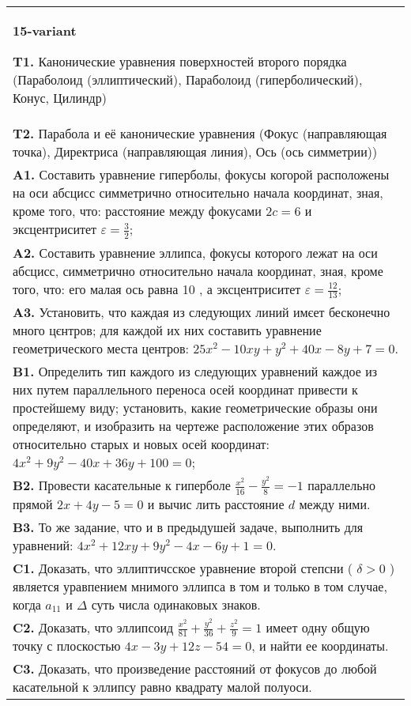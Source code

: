 \documentclass{article}
\begin{document}
\begin{tabular}{m{17cm}}
\textbf{15-variant}
\newline

\textbf{T1.} Канонические уравнения поверхностей второго порядка (Параболоид (эллиптический), Параболоид (гиперболический), Конус, Цилиндр) \\
\textbf{T2.} Парабола и её канонические уравнения (Фокус (направляющая точка), Директриса (направляющая линия), Ось (ось симметрии)) \\
\textbf{A1.} Составить уравнение гиперболы, фокусы когорой расположены на оси абсцисс симметрично относительно начала координат, зная, кроме того, что: расстояние между фокусами $2 c=6$ и эксцентриситет $\varepsilon=\frac{3}{2}$; \\
\textbf{A2.} Составить уравнение эллипса, фокусы которого лежат на оси абсцисс, симметрично относительно начала координат, зная, кроме того, что: его малая ось равна 10 , а эксцентриситет $\varepsilon=\frac{12}{13}$; \\
\textbf{A3.} Установить, что каждая из следующих линий имєет бесконечно много цєнтров; для каждой их них составить уравнение геометрического места центров: $25 x^2-10 x y+y^2+40 x-8 y+7=0$. \\
\textbf{B1.} Определить тип каждого из следующих уравнений каждое из них путем параллельного переноса осей координат привести к простейшему виду; установить, какие геометрические образы они определяют, и изобразить на чертеже расположение этих образов относительно старых и новых осей координат: $4 x^2+9 y^2-40 x+36 y+100=0$; \\
\textbf{B2.} Провести касательные к гиперболе $\frac{x^2}{16}-\frac{y^2}{8}=-1$ параллельно прямой $2 x+4 y-5=0$ и вычис лить расстояние $d$ между ними. \\
\textbf{B3.} То же задание, что и в предыдушей задаче, выполнить для уравнений: $4 x^2+12 x y+9 y^2-4 x-6 y+1=0$. \\
\textbf{C1.} Доказать, что эллиптичсское уравнение второй степсни ( $\delta>0$ ) является уравпением мнимого эллипса в том и только в том случае, когда $a_{11}$ и $\Delta$ суть числа одинаковых знаков. \\
\textbf{C2.} Доказать, что эллипсоид $\frac{x^2}{81}+\frac{y^2}{36}+\frac{z^2}{9}=1$ имеет одну общую точку с плоскостью $4 x-3 y+12 z-54=0$, и найти ее координаты. \\
\textbf{C3.} Доказать, что произведение расстояний от фокусов до любой касательной к эллипсу равно квадрату малой полуоси. \\

\end{tabular}
\vspace{1cm}
\end{document}

